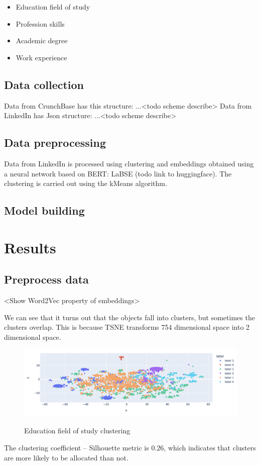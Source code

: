 \documentclass[12pt]{article}
\theoremstyle{plain}
\theoremstyle{definition}
\begin{document}
\begin{itemize}
    \item Education field of study
    \item Profession skills
    \item Academic degree
    \item Work experience
\end{itemize}

\subsection{Data collection}

Data from CrunchBase has this structure: ...<todo scheme describe>
Data from LinkedIn has Json structure: ...<todo scheme describe>


\subsection{Data preprocessing}

Data from LinkedIn is processed using clustering and embeddings obtained using a neural network based on BERT: LaBSE (todo link to huggingface). The clustering is carried out using the kMeans algorithm.

\subsection{Model building}

\section{Results}

\subsection{Preprocess data}

<Show Word2Vec property of embeddings>

We can see that it turns out that the objects fall into clusters, but sometimes the clusters overlap. This is because TSNE transforms 754 dimensional space into 2 dimensional space. 

\begin{figure}[!h]
  \centering
  \includegraphics[width=160mm]{figures/paper/kMeans-9_03.png}
  \label{fig:gd}
  \caption{Education field of study clustering}
\end{figure}

The clustering coefficient -- Silhouette  metric is $0.26$, which indicates that clusters are more likely to be allocated than not.
\end{document}
